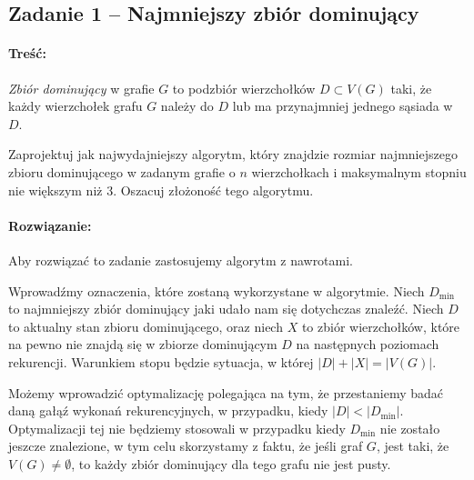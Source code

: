 \subsection{Zadanie 1 -- Najmniejszy zbiór dominujący}
\paragraph{Treść:}
\textit{Zbiór dominujący} w grafie $G$ to podzbiór wierzchołków 
$D \subset V(G)$ taki, że każdy wierzchołek grafu $G$
należy do $D$ lub ma przynajmniej jednego sąsiada w $D$.

Zaprojektuj jak najwydajniejszy algorytm, który znajdzie rozmiar najmniejszego zbioru dominującego w zadanym
grafie o $n$ wierzchołkach i maksymalnym stopniu nie większym niż 3. Oszacuj złożoność tego algorytmu.

\paragraph{Rozwiązanie:}
Aby rozwiązać to zadanie zastosujemy algorytm z nawrotami.

Wprowadźmy oznaczenia, które zostaną wykorzystane w algorytmie.
Niech $D_{\min}$ to najmniejszy zbiór dominujący jaki udało 
nam się dotychczas znaleźć.
Niech $D$ to aktualny stan zbioru dominującego, oraz
niech $X$ to zbiór wierzchołków, które na pewno nie znajdą się 
w zbiorze dominującym $D$ na następnych poziomach rekurencji.
Warunkiem stopu będzie sytuacja, w której $|D| + |X| = |V(G)|$.

Możemy wprowadzić optymalizację polegająca na tym, że 
przestaniemy badać daną gałąź wykonań rekurencyjnych,
w przypadku, kiedy $|D| < |D_{\min}|$. Optymalizacji tej nie będziemy
stosowali w przypadku kiedy $D_{\min}$ nie zostało jeszcze znalezione,
w tym celu skorzystamy z faktu, że jeśli graf $G$, jest 
taki, że $V(G) \not = \emptyset$,
to każdy zbiór dominujący dla tego grafu nie jest pusty.

